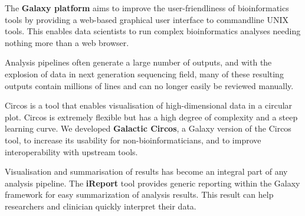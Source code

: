 The \textbf{Galaxy platform} aims to improve the user-friendliness of bioinformatics tools by providing a web-based graphical user interface to commandline UNIX tools. This enables data scientists to run complex bioinformatics analyses needing nothing more than a web browser.

Analysis pipelines often generate a large number of outputs, and with the explosion of data in next generation sequencing field, many of these resulting outputs contain millions of lines and can no longer easily be reviewed manually.

Circos is a tool that enables visualisation of high-dimensional data in a circular plot. Circos is extremely flexible but has a high degree of complexity and a steep learning curve. We developed \textbf{Galactic Circos}, a Galaxy version of the Circos tool, to increase its usability for non-bioinformaticians, and to improve interoperability with upstream tools.

Visualisation and summarisation of results has become an integral part of any analysis pipeline. The \textbf{iReport} tool provides generic reporting within the Galaxy framework for easy summarization of analysis results. This result can help researchers and clinician quickly interpret their data.

